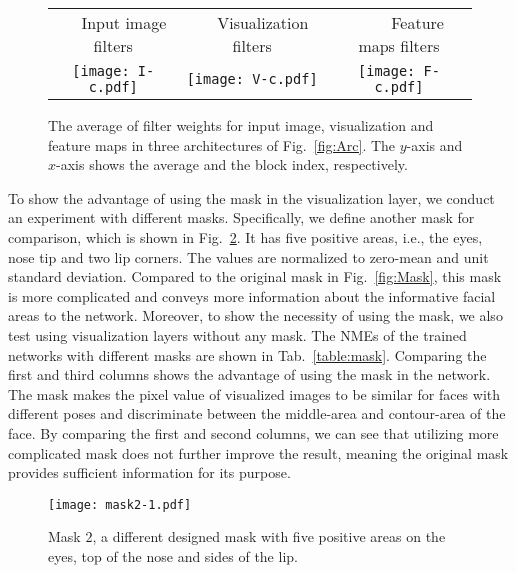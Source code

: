 \begin{figure}\tiny
\figvspace\vspace{-2mm}
\begin{center}
\begin{tabular}{@{}ccc@{}}
$\quad$ Input image filters & $\quad$ Visualization filters & $\qquad$ Feature maps filters\\
\texttt{[image: I-c.pdf]} &
\texttt{[image: V-c.pdf]} &
\texttt{[image: F-c.pdf]}



\end{tabular}
\end{center}
\figvspace
\caption{The average of filter weights for input image, visualization and feature maps in three architectures of Fig.~\ref{fig:Arc}. The $y$-axis and $x$-axis shows the average and the block index, respectively.} 
\label{fig:Arc_Analysis}\vspace{-7mm}

\end{figure}


To show the advantage of using the mask in the visualization layer, we conduct an experiment with different masks. 
Specifically, we define another mask for comparison, which is shown in Fig.~\ref{fig:Mask2}. 
It has five positive areas, i.e., the eyes, nose tip and two lip corners. 
The values are normalized to zero-mean and unit standard deviation. 
Compared to the original mask in Fig.~\ref{fig:Mask}, this mask is more complicated and conveys more information about the informative facial areas to the network. 
Moreover, to show the necessity of using the mask, we also test using visualization layers without any mask. 
The NMEs of the trained networks with different masks are shown in Tab.~\ref{table:mask}. 
Comparing the first and third columns shows the advantage of using the mask in the network. The mask makes the pixel value of visualized images to be similar for faces with different poses and discriminate between the middle-area and contour-area of the face. By comparing the first and second columns, we can see that utilizing more complicated mask does not further improve the result, meaning the original mask provides sufficient information for its purpose. 

\begin{figure}[t!]\small
\begin{center}
\texttt{[image: mask2-1.pdf]} 
\end{center}
\figvspace
\caption{Mask $2$, a different designed mask with five positive areas on the eyes, top of the nose and sides of the lip.} 
\label{fig:Mask2} \vspace{-2mm}\end{figure}



